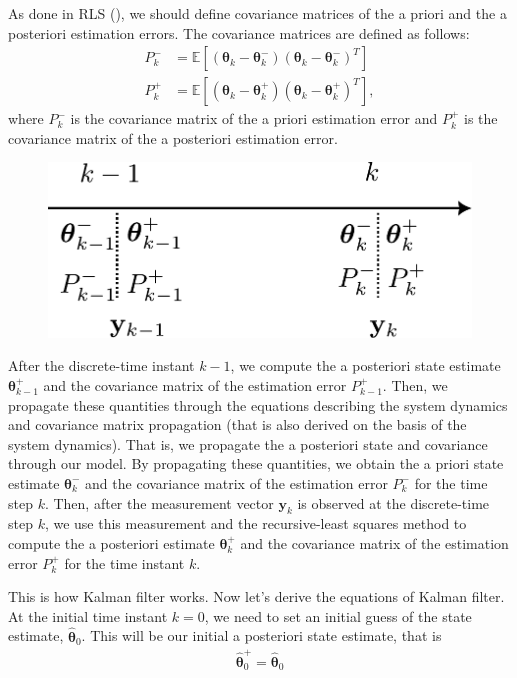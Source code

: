 As done in RLS (\cf {}), we should define covariance matrices of the a priori and the a posteriori estimation errors. The covariance matrices are defined as follows:
\begin{align*}
	P_{k}^{-}&=\mathbb{E}[(\boldsymbol{\theta}_{k}-\boldsymbol{\theta}_{k}^{-})(\boldsymbol{\theta}_{k}-\boldsymbol{\theta}_{k}^{-})^{T}] \\
	P_{k}^{+}&=\mathbb{E}[(\boldsymbol{\theta}_{k}-\boldsymbol{\theta}_{k}^{+})(\boldsymbol{\theta}_{k}-\boldsymbol{\theta}_{k}^{+})^{T}],
\end{align*}
where $P_{k}^{-}$ is the covariance matrix of the a priori estimation error and $P_{k}^{+}$ is the covariance matrix of the a posteriori estimation error. 
\begin{figure}[h]
	\centering
	\includegraphics[scale=0.6]{./images/state_space/kalman_filter_1.pdf}
\end{figure}

After the discrete-time instant $k-1$, we compute the a posteriori state estimate $\boldsymbol{\theta}_{k-1}^{+}$ and the covariance matrix of the estimation error $P_{k-1}^{+}$. Then, we propagate these quantities through the equations describing the system dynamics and covariance matrix propagation (that is also derived on the basis of the system dynamics). That is, we propagate the a posteriori state and covariance through our model. By propagating these quantities, we obtain the a priori state estimate $\boldsymbol{\theta}_{k}^{-}$ and the covariance matrix of the estimation error $P_{k}^{-}$ for the time step $k$. Then, after the measurement vector $\mathbf{y}_{k}$ is observed at the discrete-time step $k$, we use this measurement and the recursive-least squares method to compute the a posteriori estimate $\boldsymbol{\theta}_{k}^{+}$ and the covariance matrix of the estimation error $P_{k}^{+}$ for the time instant $k$.

This is how Kalman filter works. Now let's derive the equations of Kalman filter. At the initial time instant $k=0$, we need to set an initial guess of the state estimate, $\hat{\boldsymbol{\theta}}_{0}$. This will be our initial a posteriori state estimate, that is
\begin{align*}
	\hat{\boldsymbol{\theta}}_{0}^{+}=\hat{\boldsymbol{\theta}}_{0}
\end{align*}

